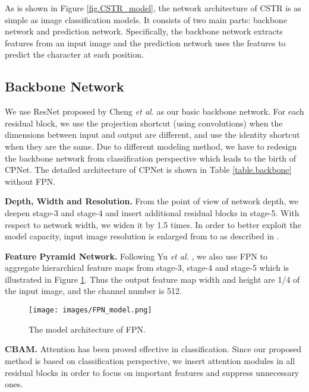 \documentclass[final]{cvpr}
\begin{document}
As is shown in Figure \ref{fig.CSTR_model}, the network architecture of CSTR is as simple as image classification models. It consists of two main parts:
backbone network and prediction network.
Specifically, the backbone network extracts features from an input image and the prediction network uses the features to predict the character at each position.

\subsection{Backbone Network}
\label{section.bacbone_network}
We use ResNet proposed by Cheng \textit{et al.} \cite{cheng2017focusing} as our basic backbone network. For each residual block, we use the projection shortcut (using  convolutions) when the dimensions between input and output are different, and use the identity shortcut when they are the same.
Due to different modeling method, we have to redesign the backbone network from classification perspective which leads to the birth of CPNet. The detailed architecture of CPNet is shown in Table \ref{table.backbone} without FPN.

\textbf{Depth, Width and Resolution.}
From the point of view of network depth, we deepen stage-3 and stage-4 and insert additional residual blocks in stage-5. With respect to network width, we widen it by 1.5 times.
In order to better exploit the model capacity, input image resolution is enlarged from  to  as described in \cite{tan2019efficientnet}.

\textbf{Feature Pyramid Network.}
Following Yu \textit{et al.} \cite{yu2020towards}, we also use FPN \cite{lin2017feature} to aggregate hierarchical feature maps from stage-3, stage-4 and stage-5 which is illustrated in Figure \ref{fig.FPN_model}. Thus the output feature map width and height are 1/4 of the input image, and the channel number is 512.

\begin{figure}[ht]
\centering
  \texttt{[image: images/FPN\_model.png]}
\centering
\caption{The model architecture of FPN.}
\label{fig.FPN_model}
\end{figure}

\textbf{CBAM.}
Attention \cite{woo2018cbam} has been proved effective in classification. Since our proposed method is based on classification perspective, we insert attention modules \cite{woo2018cbam} in all residual blocks in order to focus on important features and suppress unnecessary ones.
\end{document}
